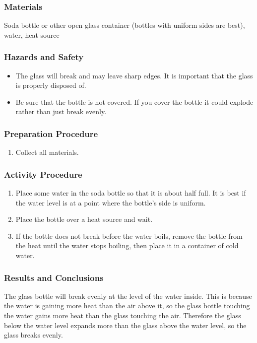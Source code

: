 \subsubsection*{Materials}
Soda bottle or other open glass container (bottles with uniform sides are best), water, heat source

\subsubsection*{Hazards and Safety}
\begin{itemize}
\item{The glass will break and may leave sharp edges.  It is important that the glass is properly disposed of.}
\item{Be sure that the bottle is not covered.  If you cover the bottle it could explode rather than just break evenly.}
\end{itemize}

\subsubsection*{Preparation Procedure}
\begin{enumerate}
\item{Collect all materials.}
\end{enumerate}

\subsubsection*{Activity Procedure}
\begin{enumerate}
\item{Place some water in the soda bottle so that it is about half full.  It is best if the water level is at a point where the bottle's side is uniform.}
\item{Place the bottle over a heat source and wait.}
\item{If the bottle does not break before the water boils, remove the bottle from the heat until the water stops boiling, then place it in a container of cold water.}
\end{enumerate}

\subsubsection*{Results and Conclusions}
The glass bottle will break evenly at the level of the water inside.  This is because the water is gaining more heat than the air above it, so the glass bottle touching the water gains more heat than the glass touching the air.  Therefore the glass below the water level expands more than the glass above the water level, so the glass breaks evenly.

